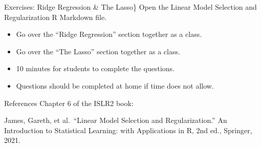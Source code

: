\documentclass[
  ignorenonframetext,
  aspectratio=169,
]{beamer}
\begin{document}
\begin{frame}{Exercises: Ridge Regression \& The Lasso\}}
\protect\hypertarget{exercises-ridge-regression-the-lasso}{}
Open the Linear Model Selection and Regularization R Markdown file.

\begin{itemize}
\item
  Go over the ``Ridge Regression'' section together as a class.
\item
  Go over the ``The Lasso'' section together as a class.
\item
  10 minutes for students to complete the questions.
\item
  Questions should be completed at home if time does not allow.
\end{itemize}
\end{frame}

\begin{frame}{References}
\protect\hypertarget{references}{}
Chapter 6 of the ISLR2 book:

James, Gareth, et al.~``Linear Model Selection and Regularization.'' An
Introduction to Statistical Learning: with Applications in R, 2nd ed.,
Springer, 2021.
\end{frame}
\end{document}
